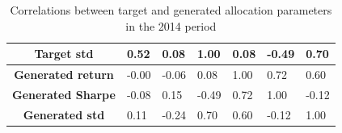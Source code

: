 \begin{table}[h]
{\begin{tabular}{|c|l|l|l|l|l|l|}
			\textbf{Target std}             & 0.52                                                                                   & 0.08                                                                                   & 1.00                                                                                & 0.08                                                                                      & -0.49                                                                                     & 0.70                                                                                   \\ \hline
			\textbf{Generated return}       & -0.00                                                                                  & -0.06                                                                                  & 0.08                                                                                & 1.00                                                                                      & 0.72                                                                                      & 0.60                                                                                   \\ \hline
			\textbf{Generated Sharpe}       & -0.08                                                                                  & 0.15                                                                                   & -0.49                                                                               & 0.72                                                                                      & 1.00                                                                                      & -0.12                                                                                  \\ \hline
			\textbf{Generated std}          & 0.11                                                                                   & -0.24                                                                                  & 0.70                                                                                & 0.60                                                                                      & -0.12                                                                                     & 1.00                                                                                   \\ \hline
		\end{tabular}%
	}
	\caption[Performance correlation target-generated allocation]{Correlations between target and generated allocation parameters in the 2014 period \label{table:parametrization_correlation}}
\end{table}

